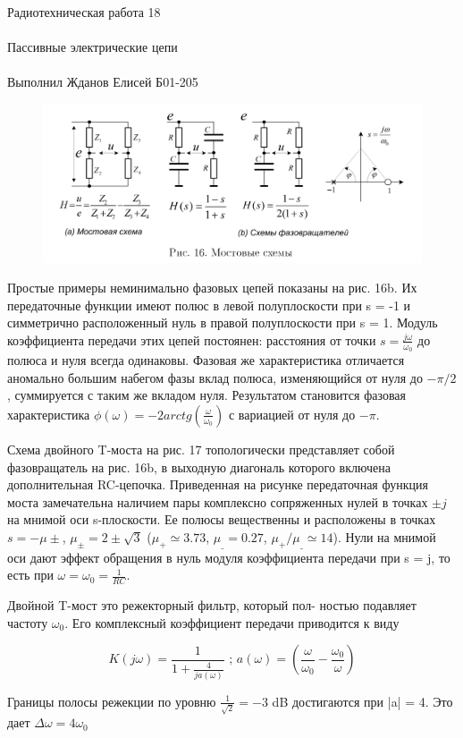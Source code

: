 \documentclass{astroedu-lab}
\begin{document}
\begin{problem}{\huge Радиотехническая работа 18\\\\Пассивные электрические цепи\\\\Выполнил Жданов Елисей Б01-205}
\begin{figure}[!h]
	\centering
	\includegraphics[width=1\textwidth]{3_3.png}
	\label{fig:boiler}
\end{figure}

Простые примеры неминимально фазовых цепей показаны на рис. 16b. Их передаточные функции имеют полюс в левой полуплоскости при s = -1 и симметрично расположенный нуль в правой полуплоскости при s = 1. Модуль коэффициента передачи этих цепей постоянен: расстояния от точки $s = \frac{j \omega}{\omega_0}$ до полюса и нуля всегда одинаковы. Фазовая же характеристика отличается аномально большим набегом фазы вклад полюса, изменяющийся от нуля до $-\pi/2$, суммируется с таким же
вкладом нуля. Результатом становится фазовая характеристика $\phi(\omega) = -2 arctg\left( \frac{\omega}{\omega_0} \right)$ с вариацией от нуля до $-\pi$.

Схема двойного T-моста на рис. 17 топологически представляет собой фазовращатель на рис. 16b, в выходную диагональ которого включена дополнительная RC-цепочка. Приведенная на рисунке передаточная функция моста замечательна наличием пары комплексно сопряженных нулей в точках $\pm j$ на мнимой оси s-плоскости. Ее полюсы вещественны и расположены в точках $s = -\mu{\pm}$, $\mu_{\pm} = 2 \pm \sqrt{3}$ ($\mu_{+} \simeq 3.73$, $\mu_{\_} = 0.27$, $\mu_{+} / \mu_{\_} \simeq 14$).
Нули на мнимой оси дают эффект обращения в нуль модуля коэффициента передачи при s = j, то есть при $\omega = \omega_0 = \frac{1}{R C}$.

Двойной T-мост это режекторный фильтр, который пол-
ностью подавляет частоту $\omega_0$. Его комплексный коэффициент
передачи приводится к виду

\begin{equation}
	K(j \omega) = \frac{1}{1 + \frac{4}{j a(\omega)}} \text{ ; } a(\omega) = \left( \frac{\omega}{\omega_0} - \frac{\omega_0}{\omega} \right)
\end{equation}

Границы полосы режекции по уровню $\frac{1}{\sqrt{2}} = -3$ dB достигаются при |a| = 4. Это дает $\Delta \omega = 4 \omega_0$


\end{problem}
\end{document}
